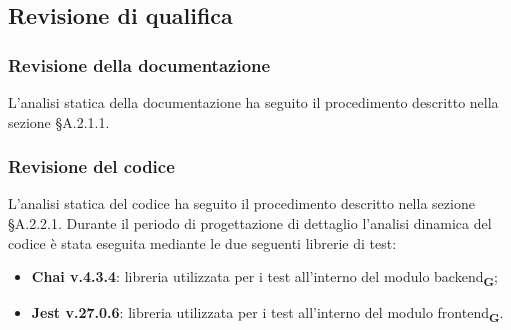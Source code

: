 \subsection{Revisione di qualifica}
\subsubsection{Revisione della documentazione}
L'analisi statica della documentazione ha seguito il procedimento descritto nella sezione §A.2.1.1.
\subsubsection{Revisione del codice}
L'analisi statica del codice ha seguito il procedimento descritto nella sezione §A.2.2.1.
Durante il periodo di progettazione di dettaglio l'analisi dinamica del codice è stata eseguita mediante le due seguenti librerie di test:
\begin{itemize}
    \item \textbf{Chai v.4.3.4}: libreria utilizzata per i test all'interno del modulo backend\textsubscript{\textbf{G}};
    \item \textbf{Jest v.27.0.6}: libreria utilizzata per i test all'interno del modulo frontend\textsubscript{\textbf{G}}.
\end{itemize}
